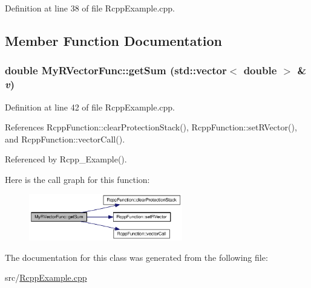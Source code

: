 Definition at line 38 of file RcppExample.cpp.

\subsection{Member Function Documentation}
\hypertarget{classMyRVectorFunc_2eba5a390ca620a687e77208bfbb6df4}{
\subsubsection[{getSum}]{\setlength{\rightskip}{0pt plus 5cm}double MyRVectorFunc::getSum (std::vector$<$ double $>$ \& {\em v})}}
\label{classMyRVectorFunc_2eba5a390ca620a687e77208bfbb6df4}




Definition at line 42 of file RcppExample.cpp.

References RcppFunction::clearProtectionStack(), RcppFunction::setRVector(), and RcppFunction::vectorCall().

Referenced by Rcpp\_\-Example().

Here is the call graph for this function:\nopagebreak
\begin{figure}[H]
\begin{center}
\leavevmode
\includegraphics[width=190pt]{classMyRVectorFunc_2eba5a390ca620a687e77208bfbb6df4_cgraph}
\end{center}
\end{figure}


The documentation for this class was generated from the following file:\begin{CompactItemize}
\item 
src/\hyperlink{RcppExample_8cpp}{RcppExample.cpp}\end{CompactItemize}
